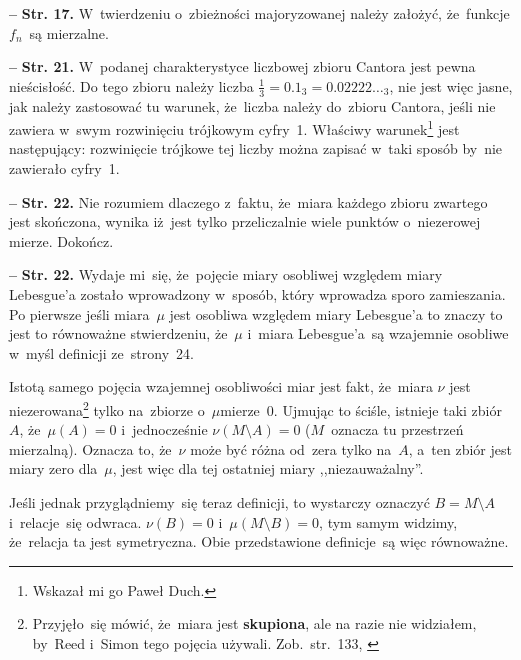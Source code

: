 \documentclass[a4paper,11pt]{article}
\newcommand{\spaceFour}{0.5em}
\newcommand{\ld}{\ldots}
\newcommand{\tb}{\textbf}
\newcommand{\noi}{\noindent}
\newcommand{\ld}{\ldots}
\newcommand{\tb}{\textbf}
\newcommand{\noi}{\noindent}
\newcommand{\start}{\noi \tb{--} {}}
\newcommand{\Str}[1]{\tb{Str. #1.}}
\newcommand{\fr}{\frac}
\newcommand{\setm}{\setminus}
\newcommand{\Dok}{{\color{red} Dokończ.}}
\begin{document}
\vspace{\spaceFour}


\start \Str{17} W~twierdzeniu o~zbieżności majoryzowanej należy
założyć, że~funkcje $f_{ n }$~są mierzalne. %

\vspace{\spaceFour}


\start \Str{21} W~podanej charakterystyce liczbowej zbioru Cantora
jest pewna nieścisłość. Do tego zbioru należy liczba
$\fr{ 1 }{ 3 } = 0.1_{ 3 } = 0.02222\ld_{ 3 }$, nie jest więc jasne,
jak należy zastosować tu warunek, że~liczba należy do~zbioru Cantora,
jeśli nie zawiera w~swym rozwinięciu trójkowym cyfry~1. Właściwy
warunek\footnote{Wskazał mi go Paweł Duch.} jest następujący:
rozwinięcie trójkowe tej liczby można zapisać w~taki sposób by~nie
zawierało cyfry~1. %

\vspace{\spaceFour}


\start \Str{22} Nie rozumiem dlaczego z~faktu, że~miara każdego zbioru
zwartego jest skończona, wynika iż~jest tylko przeliczalnie wiele
punktów o~niezerowej mierze. \Dok

\vspace{\spaceFour}


\start \Str{22} Wydaje mi~się, że~pojęcie miary osobliwej względem
miary Lebesgue'a zostało wprowadzony w~sposób, który wprowadza sporo
zamieszania. Po pierwsze jeśli miara~$\mu$ jest osobliwa względem
miary Lebesgue'a to znaczy to jest to równoważne stwierdzeniu,
że~$\mu$ i~miara Lebesgue'a~są wzajemnie osobliwe w~myśl definicji
ze~strony~24.

Istotą samego pojęcia wzajemnej osobliwości miar jest fakt, że~miara
$\nu$ jest niezerowana\footnote{Przyjęło~się mówić, że~miara jest
  \tb{skupiona}, ale na razie nie widziałem, by~Reed i~Simon tego
  pojęcia używali. Zob.~str.~133, \cite{Rudin98}} tylko na~zbiorze
o~$\mu$\dywiz mierze~0. Ujmując to ściśle, istnieje taki zbiór~$A$,
że~$\mu( A ) = 0$ i~jednocześnie $\nu( M \setm A ) = 0$ ($M$~oznacza
tu przestrzeń mierzalną). Oznacza to, że~$\nu$ może być różna od~zera
tylko na~$A$, a~ten zbiór jest miary zero dla~$\mu$, jest więc dla tej
ostatniej miary ,,niezauważalny''.

Jeśli jednak przyglądniemy~się teraz definicji, to wystarczy oznaczyć
$B = M \setm A$ i~relacje~się odwraca. $\nu( B ) = 0$
i~$\mu( M \setm B ) = 0$, tym samym widzimy, że~relacja ta jest
symetryczna. Obie przedstawione definicje~są więc równoważne.
\end{document}
